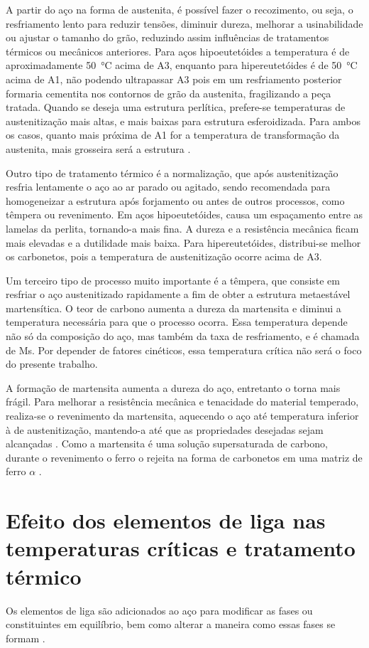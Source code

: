\documentclass[brazil,tf,epusp]{usp}  %
\begin{document}
A partir do aço na forma de austenita, é possível fazer o recozimento, ou seja, o resfriamento lento para reduzir tensões, diminuir dureza, melhorar a usinabilidade ou ajustar o tamanho do grão, reduzindo assim influências de tratamentos térmicos ou mecânicos anteriores. Para aços hipoeutetóides a temperatura é de aproximadamente \SI{50}{\celsius} acima de A3, enquanto para hipereutetóides é de \SI{50}{\celsius} acima de A1, não podendo ultrapassar A3 pois em um resfriamento posterior formaria cementita nos contornos de grão da austenita, fragilizando a peça tratada. Quando se deseja uma estrutura perlítica, prefere-se temperaturas de austenitização mais altas, e mais baixas para estrutura esferoidizada. Para ambos os casos, quanto mais próxima de A1 for a temperatura de transformação da austenita, mais grosseira será a estrutura .

Outro tipo de tratamento térmico é a normalização, que após austenitização resfria lentamente o aço ao ar parado ou agitado, sendo recomendada para homogeneizar a estrutura após forjamento ou antes de outros processos, como têmpera ou revenimento. Em aços hipoeutetóides, causa um espaçamento entre as lamelas da perlita, tornando-a mais fina. A dureza e a resistência mecânica ficam mais elevadas e a dutilidade mais baixa. Para hipereutetóides, distribui-se melhor os carbonetos, pois a temperatura de austenitização ocorre acima de A3.

Um terceiro tipo de processo muito importante é a têmpera, que consiste em resfriar o aço austenitizado rapidamente a fim de obter a estrutura metaestável martensítica. O teor de carbono aumenta a dureza da martensita e diminui a temperatura necessária para que o processo ocorra. Essa temperatura depende não só da composição do aço, mas também da taxa de resfriamento, e é chamada de Ms. Por depender de fatores cinéticos, essa temperatura crítica não será o foco do presente trabalho.

A formação de martensita aumenta a dureza do aço, entretanto o torna mais frágil. Para  melhorar a resistência mecânica e tenacidade do material temperado, realiza-se o revenimento da martensita, aquecendo o aço até temperatura inferior à de austenitização, mantendo-a até que as propriedades desejadas sejam alcançadas \cite{Silva2010}. Como a martensita é uma solução supersaturada de carbono, durante o revenimento o ferro o rejeita na forma de carbonetos em uma matriz de ferro $\alpha$ \cite{Honeycombe1982}.

\section{Efeito dos elementos de liga nas temperaturas críticas e tratamento térmico}
Os elementos de liga são adicionados ao aço para modificar as fases ou constituintes em equilíbrio, bem como alterar a maneira como essas fases se formam \cite{Silva2010}.
\end{document}
